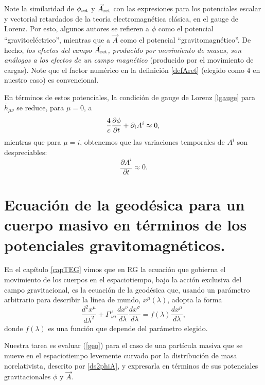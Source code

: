 Note la similaridad de $\phi_{\rm ret}$ y $\vec{A}_{\rm ret}$ con las expresiones para los potenciales escalar y vectorial retardados de la teoría electromagnética clásica, en el gauge de Lorenz. Por esto, algunos autores se refieren a $\phi$ como el potencial  ``gravitoeléctrico'', mientras que a $\vec{A}$ como el potencial ``gravitomagnético''. De hecho, \textit{los efectos del campo $\vec{A}_{\rm ret}$, producido por movimiento de masas, son análogos a los efectos de un campo magnético} (producido por el movimiento de cargas). Note que el factor numérico en la definición \eqref{defAret} (elegido como $4$ en nuestro caso) es convencional.

En términos de estos potenciales, la condición de gauge de Lorenz \eqref{lgauge} para $\bar{h}_{\mu\nu}$ se reduce, para $\mu=0$, a
\begin{equation}
\frac{4}{c}\frac{\partial \phi}{\partial t}+\partial_i A^i\approx 0,\label{gaugelorenz0}\\
\end{equation}
mientras que para $\mu=i$, obtenemos que las variaciones temporales de $A^i$ son despreciables:
\begin{equation}
\frac{\partial A^i}{\partial t}\approx 0.\label{a0}
\end{equation}

\section{Ecuación de la geodésica para un cuerpo masivo en términos de los potenciales gravitomagnéticos.}

En el capítulo \ref{capTEG} vimos que en RG la ecuación que gobierna el movimiento de los cuerpos en el espaciotiempo, bajo la acción exclusiva del campo gravitacional, es la ecuación de la geodésica que, usando un parámetro arbitrario para describir la línea de mundo, $x^\mu(\lambda)$, adopta la forma
\begin{equation}
\frac{d^2x^\mu }{d\lambda^2}+\Gamma^\mu _{\ \nu\sigma}\frac{dx^{\nu}}{d\lambda}\frac{dx^{\sigma}}{d\lambda}=f(\lambda)\frac{dx^\mu }{d\lambda},\label{geo}
\end{equation}
donde $f(\lambda)$ es una función que depende del parámetro elegido.

Nuestra tarea es evaluar (\ref{geo}) para el caso de una partícula masiva que se mueve en el espaciotiempo levemente curvado por la distribución de masa norelativista, descrito por \eqref{ds2phiA}, y expresarla en términos de sus potenciales gravitacionales $\phi$ y $\vec{A}$.


